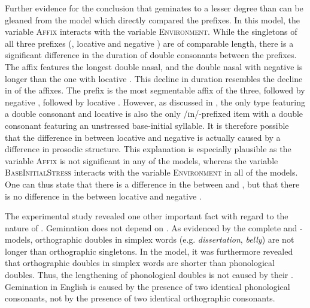 Further evidence for the conclusion that  geminates to a lesser degree than  can be gleaned from the model which directly compared the prefixes. In this model, the variable \textsc{Affix} interacts with the variable \textsc{Environment}. 
While the singletons of all three prefixes (, locative  and negative ) are of comparable length, there is a significant difference in the duration of double consonants between the prefixes. The affix  features the longest double nasal,  and the double nasal with negative  is longer than the one with locative . This decline in duration resembles the decline in  of the affixes. The prefix  is the most segmentable affix of the three, followed by negative , followed by locative . However, as discussed in , the only type featuring a double consonant and locative  is also the only /ɪn/-prefixed item with a double consonant featuring an unstressed base-initial syllable. It is therefore possible that the difference in  between locative and negative  is actually caused by a difference in prosodic structure. This explanation is especially plausible as the variable \textsc{Affix} is not significant in any of the models, whereas the variable \textsc{BaseInitialStress} interacts with the variable \textsc{Environment} in all of the models. 
One can thus state that there is a difference in the  between  and , but that there is no difference in the  between locative and negative .


The experimental study revealed one other important fact with regard to the nature of . Gemination does not depend on . As evidenced by the complete  and -models, orthographic doubles in simplex words (e.g. \textit{dissertation}, \textit{belly}) are not longer than orthographic singletons. 
In the model, it was furthermore revealed that orthographic doubles in simplex words are shorter than phonological doubles. 
Thus, the lengthening of phonological doubles is not caused by their . %
Gemination in English is caused by the presence of two identical phonological consonants, not by the presence of two identical orthographic consonants.

